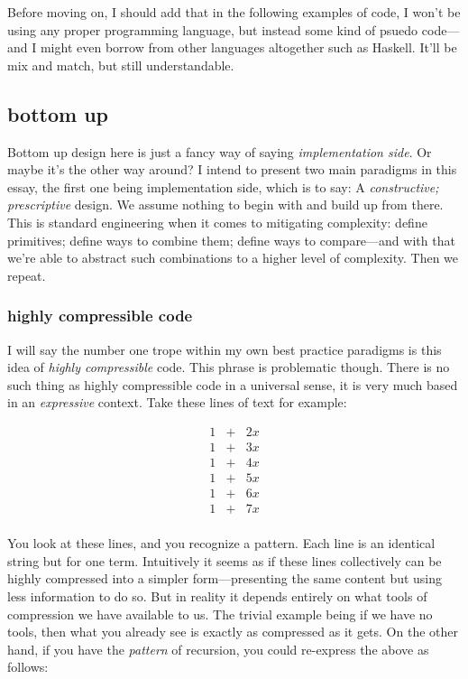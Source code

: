 \documentclass[twoside]{article}
\begin{document}
Before moving on, I should add that in the following examples of code, I won't be using any proper programming language,
but instead some kind of psuedo code---and I might even borrow from other languages altogether such as Haskell.
It'll be mix and match, but still understandable.

\subsection*{bottom up}

Bottom up design here is just a fancy way of saying \emph{implementation side}. Or maybe it's the other way around?
I intend to present two main paradigms in this essay, the first one being implementation side, which is to say:
A \emph{constructive; prescriptive} design. We assume nothing to begin with and build up from there. This is standard
engineering when it comes to mitigating complexity: define primitives; define ways to combine them;
define ways to compare---and with that we're able to abstract such combinations to a higher level of complexity.
Then we repeat.

\subsubsection*{highly compressible code}

I will say the number one trope within my own best practice paradigms is this idea of \emph{highly compressible} code.
This phrase is problematic though. There is no such thing as highly compressible code in a universal sense, it is
very much based in an \emph{expressive} context. Take these lines of text for example:

$$ \begin{array}{ccc}
1 & + & 2x \\
1 & + & 3x \\
1 & + & 4x \\
1 & + & 5x \\
1 & + & 6x \\
1 & + & 7x \\
\end{array} $$

You look at these lines, and you recognize a pattern. Each line is an identical string but for one term.
Intuitively it seems as if these lines collectively can be highly compressed into a simpler form---presenting
the same content but using less information to do so. But in reality it depends entirely on what tools of compression
we have available to us. The trivial example being if we have no tools, then what you already see is exactly as compressed
as it gets. On the other hand, if you have the \emph{pattern} of recursion, you could re-express the above as follows:
\end{document}
